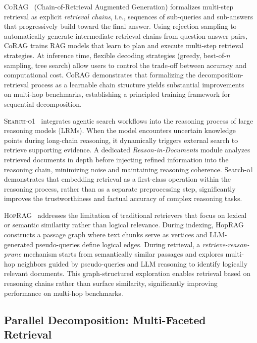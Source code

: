 \documentclass{article}
\begin{document}
\textsc{CoRAG}~\citep{CoRAG} (Chain-of-Retrieval Augmented Generation) formalizes multi-step retrieval as explicit \textit{retrieval chains}, i.e., sequences of sub-queries and sub-answers that progressively build toward the final answer. Using rejection sampling to automatically generate intermediate retrieval chains from question-answer pairs, CoRAG trains RAG models that learn to plan and execute multi-step retrieval strategies. At inference time, flexible decoding strategies (greedy, best-of-$n$ sampling, tree search) allow users to control the trade-off between accuracy and computational cost. CoRAG demonstrates that formalizing the decomposition-retrieval process as a learnable chain structure yields substantial improvements on multi-hop benchmarks, establishing a principled training framework for sequential decomposition.

\textsc{Search-o1}~\citep{Search-o1} integrates agentic search workflows into the reasoning process of large reasoning models (LRMs). When the model encounters uncertain knowledge points during long-chain reasoning, it dynamically triggers external search to retrieve supporting evidence. A dedicated \textit{Reason-in-Documents} module analyzes retrieved documents in depth before injecting refined information into the reasoning chain, minimizing noise and maintaining reasoning coherence. Search-o1 demonstrates that embedding retrieval as a first-class operation within the reasoning process, rather than as a separate preprocessing step, significantly improves the trustworthiness and factual accuracy of complex reasoning tasks.

\textsc{HopRAG}~\citep{HopRAG} addresses the limitation of traditional retrievers that focus on lexical or semantic similarity rather than logical relevance. During indexing, HopRAG constructs a passage graph where text chunks serve as vertices and LLM-generated pseudo-queries define logical edges. During retrieval, a \textit{retrieve-reason-prune} mechanism starts from semantically similar passages and explores multi-hop neighbors guided by pseudo-queries and LLM reasoning to identify logically relevant documents. This graph-structured exploration enables retrieval based on reasoning chains rather than surface similarity, significantly improving performance on multi-hop benchmarks.

\subsection{Parallel Decomposition: Multi-Faceted Retrieval}
\end{document}
